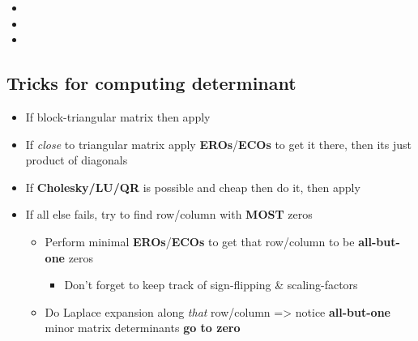 \begin{itemize}
\begin{itemize}
          \item
          \item
          \item
        \end{itemize}
\end{itemize}

\subsection*{Tricks for computing
  determinant}

\begin{itemize}

  \item
        If block-triangular matrix then apply
  \item
        If \emph{close} to triangular matrix apply \textbf{EROs}/\textbf{ECOs}
        to get it there, then its just product of diagonals
  \item
        If \textbf{Cholesky/LU/QR} is possible and cheap then do it, then
        apply 
  \item
        If all else fails, try to find row/column with \textbf{MOST} zeros

        \begin{itemize}

          \item
                Perform minimal \textbf{EROs}/\textbf{ECOs} to get that row/column
                to be \textbf{all-but-one} zeros

                \begin{itemize}

                  \item
                        Don't forget to keep track of sign-flipping \& scaling-factors
                \end{itemize}
          \item
                Do Laplace expansion along \emph{that} row/column =>
                notice \textbf{all-but-one} minor matrix determinants \textbf{go to
                  zero}
        \end{itemize}
\end{itemize}

